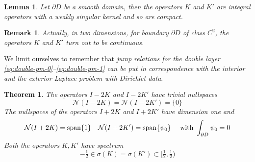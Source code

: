 \documentclass[10pt, a4paper, twoside, openright]{book}
\theoremstyle{definition}
\theoremstyle{plain}
\newtheorem{theorem}[subsection]{Theorem}
\theoremstyle{plain}
\theoremstyle{plain}
\theoremstyle{plain}
\newtheorem{remark}[subsection]{Remark}
\theoremstyle{plain}
\newtheorem{lemma}[subsection]{Lemma}
\theoremstyle{plain}
\theoremstyle{plain}
\theoremstyle{plain}
\begin{document}
\begin{lemma}
\label{lemma:K-K'-compact}
 Let $\partial D$ be a smooth domain, then the operators $K$ and $K'$ are integral operators with a weakly singular kernel and so are compact.
\end{lemma}
\begin{remark}
 Actually, in two dimensions, for boundary $\partial D$ of class $C^2$, the operators $K$ and $K'$ turn out to be continuous.
\end{remark}
We limit ourselves to remember that \emph{jump relations for the double layer \eqref{eq:double-pm-0}--\eqref{eq:double-pm-1} can be put in correspondence with the interior and the exterior Laplace problem with Dirichlet data}.
\begin{theorem}
\label{theo:K-nullspace}
 The operators $I-2K$ and $I-2K'$ have trivial nullspaces
 \begin{equation}
  \mathcal{N}(I-2K)=\mathcal{N}(I-2K')=\{0\}
 \end{equation}
 The nullspaces of the operators $I+2K$ and $I+2K'$ have dimension one and
 \begin{equation}
  \mathcal{N}(I+2K)=\textup{span}\{1\} \quad \mathcal{N}(I+2K')=\textup{span}\{\psi_0\}\quad\textup{ with }\int_{\partial D}\psi_0=0
 \end{equation}
 Both the operators $K,K'$ have spectrum
 \begin{equation}
 \label{eq:K-spectrum}
  -\tfrac{1}{2}\in\sigma(K)=\sigma(K')\subset \bigl[\tfrac{1}{2}, \tfrac{1}{2}\bigr)
 \end{equation}
\end{theorem}
\end{document}
